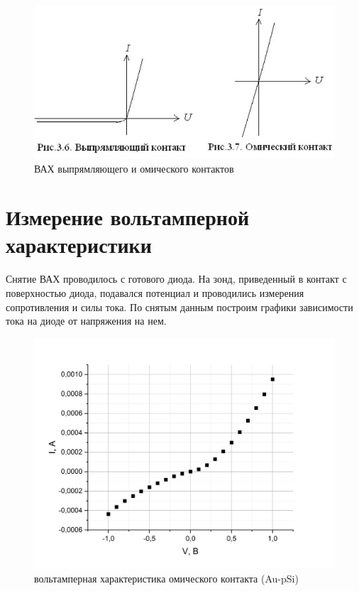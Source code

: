 \documentclass[a4paper,12pt]{article}
\begin{document}
\begin{figure}[h!]
	\begin{center}
	\includegraphics[scale = 0.5]{fig12}
	\caption{ВАХ выпрямляющего и омического контактов}
	\end{center}
\end{figure}

\newpage

\section{Измерение вольтамперной характеристики}

Снятие ВАХ проводилось с готового диода. На зонд, приведенный в
контакт с поверхностью диода, подавался потенциал и проводились измерения сопротивления и силы тока. По снятым данным построим графики зависимости тока на диоде от напряжения на нем.

\begin{figure}[h!]
	\begin{center}
	\includegraphics[scale = 0.4]{graph1}
\caption{вольтамперная характеристика омического контакта (Au-pSi)}
	\end{center}
\end{figure}
\end{document}
